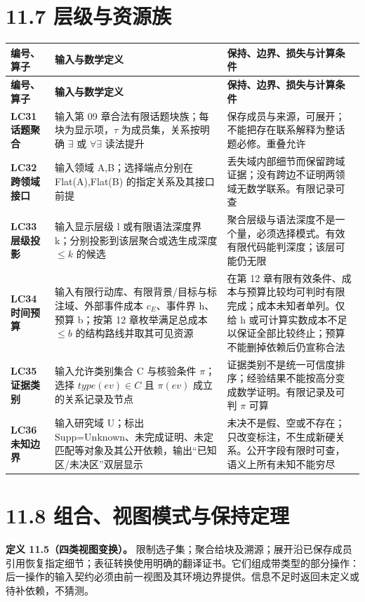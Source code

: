 \documentclass[UTF8,a4paper,zihao=-4,fontset=windows,openany]{ctexbook}
\def\mathrm#1{#1}%
\begin{document}
\section{11.7 层级与资源族}
\begingroup\small\setlength{\tabcolsep}{4pt}
\begin{longtable}{>{\raggedright\arraybackslash}p{}>{\raggedright\arraybackslash}p{}>{\raggedright\arraybackslash}p{}}
\toprule
\textbf{编号、算子} & \textbf{输入与数学定义} & \textbf{保持、边界、损失与计算条件} \\
\midrule
\endfirsthead
\toprule
\textbf{编号、算子} & \textbf{输入与数学定义} & \textbf{保持、边界、损失与计算条件} \\
\midrule
\endhead
\bottomrule
\endfoot
\bottomrule
\endlastfoot
\textbf{LC31 话题聚合} & 输入第 09 章合法有限话题块族；每块为显示项，\(\tau\) 为成员集，关系按明确 \(\exists\) 或 \(\forall\exists\) 读法提升 & 保存成员与来源，可展开；不能把存在联系解释为整话题必修。重叠允许 \\
\textbf{LC32 跨领域接口} & 输入领域 A,B；选择端点分别在 Flat(A),Flat(B) 的指定关系及其接口前提 & 丢失域内部细节而保留跨域证据；没有跨边不证明两领域无数学联系。有限记录可查 \\
\textbf{LC33 层级投影} & 输入显示层级 l 或有限语法深度界 k；分别投影到该层聚合或选生成深度\(\le k\) 的候选 & 聚合层级与语法深度不是一个量，必须选择模式。有效有限代码能判深度；该层可能仍无限 \\
\textbf{LC34 时间预算} & 输入有限行动库、有限背景/目标与标注域、外部事件成本 \(c_E\)、事件界 h、预算 b；按第 12 章枚举满足总成本\(\le b\) 的结构路线并取其可见资源 & 在第 12 章有限有效条件、成本与预算比较均可判时有限完成；成本未知者单列。仅给 h 或可计算实数成本不足以保证全部比较终止；预算不能删掉依赖后仍宣称合法 \\
\textbf{LC35 证据类别} & 输入允许类别集合 C 与核验条件 \(\pi\)；选择 \(\mathrm{type}(\mathrm{ev})\in C\) 且 \(\pi(\mathrm{ev})\) 成立的关系记录及节点 & 证据类别不是统一可信度排序；经验结果不能按高分变成数学证明。有限记录及可判 \(\pi\) 可算 \\
\textbf{LC36 未知边界} & 输入研究域 U；标出 Supp=Unknown、未完成证明、未定匹配等对象及其公开依赖，输出“已知区/未决区”双层显示 & 未决不是假、空或不存在；只改变标注，不生成新硬关系。公开字段有限时可查，语义上所有未知不能穷尽 \\
\end{longtable}
\endgroup

\section{11.8 组合、视图模式与保持定理}
\textbf{定义 11.5（四类视图变换）。} 限制选子集；聚合给块及溯源；展开沿已保存成员引用恢复指定细节；表征转换使用明确的翻译证书。它们组成带类型的部分操作：后一操作的输入契约必须由前一视图及其环境边界提供。信息不足时返回未定义或待补依赖，不猜测。
\end{document}
